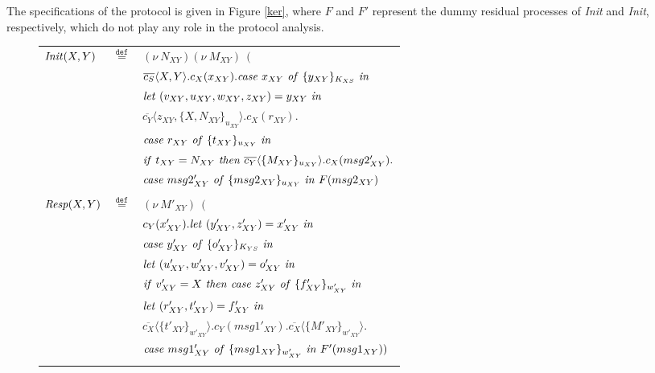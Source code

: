 \documentclass[10pt,a4paper,final,oneside,fleqn]{book}
\newcommand*{\eqdef}{\mathbin{\mathop{=}\limits^{\texttt{def}}}}
\begin{document}
\noindent
The specifications of the protocol is given in Figure \ref{ker}, where $F$ and $F'$ represent the dummy residual processes of {\itshape Init\/} and {\itshape Init\/}, respectively, which do not play any role in the protocol analysis.
\begin{figure}[!tbp]
\begin{center}
\begin{tabular}{|lll|}
\hline
$\mbox{{\itshape Init\/}}(X,Y)$&$\eqdef$&$(\nu~\!N_{XY})(\nu~\!M_{XY})~~($\\
&&$\overline{c_{S}}\langle X,Y\rangle.c_{X}(x_{XY}).\mbox{{\itshape case\/} }x_{XY}\mbox{ {\itshape of\/} }\{y_{XY}\}_{K_{XS}}\mbox{ {\itshape in\/}}$\\
&&$\mbox{{\itshape let\/} }(v_{XY},u_{XY},w_{XY},z_{XY})=y_{XY}\mbox{ {\itshape in\/}}$\\
&&$\overline{c_{Y}}\langle z_{XY},\{X,N_{XY}\}_{u_{XY}}\rangle.c_{X}(r_{XY}).$\\
&&$\mbox{{\itshape case\/} }r_{XY}\mbox{ {\itshape of\/} }\{t_{XY}\}_{u_{XY}}\mbox{ {\itshape in\/}}$\\
&&$\mbox{{\itshape if\/} }t_{XY}=N_{XY}\mbox{ {\itshape then\/} }\overline{c_{Y}}\langle\{M_{XY}\}_{u_{XY}}\rangle.c_{X}(msg2'_{XY}).$\\
&&$\mbox{{\itshape case\/} }msg2'_{XY}\mbox{ {\itshape of\/} }\{msg2_{XY}\}_{u_{XY}}\mbox{ {\itshape in\/} }F(msg2_{XY})$\\&&\\
$\mbox{{\itshape Resp\/}}(X,Y)$&$\eqdef$&$(\nu~\!M'_{XY})~~($\\
&&$c_{Y}(x'_{XY}).\mbox{{\itshape let\/} }(y'_{XY},z'_{XY})=x'_{XY}\mbox{ {\itshape in\/}}$\\
&&$\mbox{{\itshape case\/} }y'_{XY}\mbox{ {\itshape of\/} }\{o'_{XY}\}_{K_{YS}}\mbox{ {\itshape in\/}}$\\
&&$\mbox{{\itshape let\/} }(u'_{XY},w'_{XY},v'_{XY})=o'_{XY}\mbox{ {\itshape in\/}}$\\
&&$\mbox{{\itshape if\/} }v'_{XY}=X\mbox{ {\itshape then\/} }\mbox{{\itshape case\/} }z'_{XY}\mbox{ {\itshape of\/} }\{f'_{XY}\}_{w'_{XY}}\mbox{ {\itshape in\/}}$\\
&&$\mbox{{\itshape let\/} }(r'_{XY},t'_{XY})=f'_{XY}\mbox{ {\itshape in\/}}$\\
&&$\overline{c_{X}}\langle\{t'_{XY}\}_{w'_{XY}}\rangle.c_{Y}(msg1'_{XY}).\overline{c_{X}}\langle\{M'_{XY}\}_{w'_{XY}}\rangle.$\\
&&$\mbox{{\itshape case\/} }msg1'_{XY}\mbox{ {\itshape of\/} }\{msg1_{XY}\}_{w'_{XY}}\mbox{ {\itshape in\/} }F'(msg1_{XY}))$\\&&\\

\end{tabular}
\end{center}
\end{figure}
\end{document}

